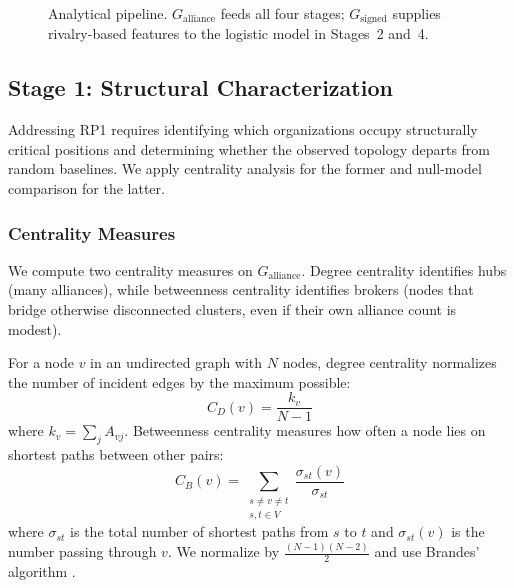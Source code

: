 \documentclass[11pt, a4paper]{article}
\begin{document}
\begin{figure}[H]
\caption{Analytical pipeline. $G_{\text{alliance}}$ feeds all four stages; $G_{\text{signed}}$ supplies rivalry-based features to the logistic model in Stages~2 and~4.}
\label{fig:methods_flow}
\end{figure}

\subsection{Stage 1: Structural Characterization}\label{sec:stage1_methods}

Addressing RP1 requires identifying which organizations occupy structurally critical positions and determining whether the observed topology departs from random baselines. We apply centrality analysis for the former and null-model comparison for the latter.

\subsubsection{Centrality Measures}\label{sec:centrality_methods}

We compute two centrality measures on $G_{\text{alliance}}$. Degree centrality identifies hubs (many alliances), while betweenness centrality identifies brokers (nodes that bridge otherwise disconnected clusters, even if their own alliance count is modest).

For a node $v$ in an undirected graph with $N$ nodes, degree centrality normalizes the number of incident edges by the maximum possible:
\begin{equation}\label{eq:degree}
    C_D(v) = \frac{k_v}{N - 1}
\end{equation}
where $k_v = \sum_{j} A_{vj}$. Betweenness centrality measures how often a node lies on shortest paths between other pairs:
\begin{equation}\label{eq:betweenness}
    C_B(v) = \sum_{\substack{s \neq v \neq t \\ s, t \in V}} \frac{\sigma_{st}(v)}{\sigma_{st}}
\end{equation}
where $\sigma_{st}$ is the total number of shortest paths from $s$ to $t$ and $\sigma_{st}(v)$ is the number passing through $v$. We normalize by $\frac{(N-1)(N-2)}{2}$ and use Brandes' algorithm \citep{brandes2001faster}.
\end{document}
